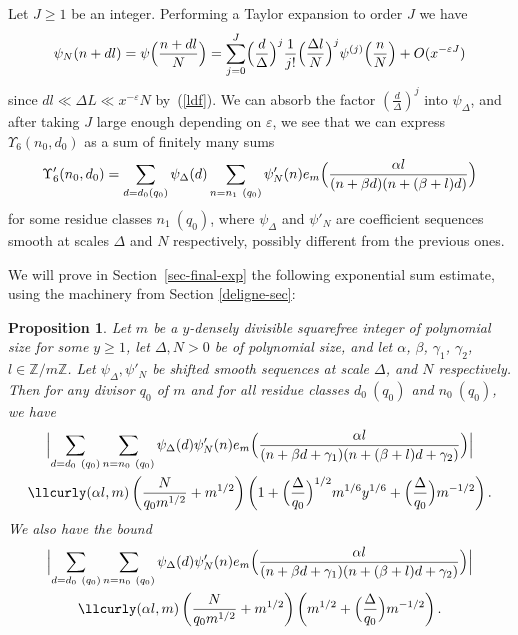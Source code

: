 \documentclass[12pt,a4paper,reqno]{amsart}
\numberwithin{equation}{section}
\theoremstyle{plain}
\newtheorem{proposition}[theorem]{Proposition}
\theoremstyle{definition}
\newcommand\Z{\mathbb{Z}}
\newcommand\eps{\varepsilon}
\renewcommand{\lessapprox}{\llcurly}
\begin{document}
Let $J\geq 1$ be an integer. Performing a Taylor expansion to order
$J$ we have
$$
\psi_N(n+dl) = \psi\Bigl(\frac{n+dl}{N}\Bigr)= \sum_{j=0}^J
\Bigl(\frac{d}{\Delta}\Bigr)^j\frac{1}{j!} \Bigl(\frac{\Delta l}{N}\Bigr)^j
\psi^{(j)}\Bigl(\frac{n}{N}\Bigr) + O( x^{-\eps J} )
$$
since $dl\ll \Delta L\ll x^{-\eps}N$ by~(\ref{ldf}).  We can absorb
the factor $(\frac{d}{\Delta})^j$ into $\psi_{\Delta}$, and after taking
$J$ large enough depending on $\eps$, we see that we can express $\Upsilon_6(n_0,d_0)$ as
a sum of finitely many sums
$$
\Upsilon'_6(n_0,d_0)= \sum_{d=d_0 (q_0)} \psi_{\Delta}(d) \sum_{n=n_1
  \ (q_0)} \psi'_N(n) e_m\Bigl(\frac{\alpha l}{(n+\beta d)(n+(\beta+l)d)}\Bigr)
$$
for some residue classes $n_1\ (q_0)$,
where $\psi_{\Delta}$ and $\psi'_N$ are coefficient sequences smooth at
scales $\Delta$ and $N$ respectively, possibly different from the previous
ones.

We will prove in Section~\ref{sec-final-exp} the following exponential
sum estimate, using the machinery from Section \ref{deligne-sec}:

\begin{proposition}\label{lode} 
  Let $m$ be a $y$-densely divisible squarefree integer of polynomial
  size for some $y \geq 1$, let $\Delta, N > 0$ be of polynomial size,
  and let $\alpha$, $\beta$, $\gamma_1$, $\gamma_2$, $l\in \Z/m\Z$.
  Let $\psi_{\Delta}, \psi'_N$ be shifted smooth sequences at scale
  $\Delta$, and $N$ respectively.   Then for any divisor $q_0$ of $m$
  and for all residue classes $d_0\ (q_0)$ and $n_0\ (q_0)$, we have
\begin{multline}\label{eq-lode-1}
  \Bigl|\sum_{d=d_0\ (q_0)} \sum_{n=n_0\ (q_0)} \psi_{\Delta}(d) \psi'_N(n)
  e_m\Bigl(
  \frac{\alpha l}{(n+\beta d+\gamma_1)(n+(\beta+l)d+\gamma_2)} \Bigr)\Bigr| \\
  \lessapprox (\alpha l,m) \left(\frac{N}{q_0m^{1/2}}+m^{1/2} \right)
  \left( 1 + \Bigl(\frac{\Delta}{q_0}\Bigr)^{1/2} m^{1/6} y^{1/6} +
    \Bigl(\frac{\Delta}{q_0}\Bigr) m^{-1/2}\right).
\end{multline}
We also have the bound
\begin{multline}\label{eq-lode-2}
  \Bigl|\sum_{d=d_0\ (q_0)} \sum_{n=n_0\ (q_0)} \psi_{\Delta}(d)
  \psi'_N(n) e_m\Bigl(
  \frac{\alpha l}{(n+\beta d+\gamma_1)(n+(\beta+l)d+\gamma_2)} \Bigr)\Bigr| \\
  \lessapprox (\alpha l,m) \left( \frac{N}{q_0m^{1/2}}+ m^{1/2} \right)
  \left( m^{1/2} + \Bigl(\frac{\Delta}{q_0}\Bigr) m^{-1/2}\right).
\end{multline}
\end{proposition}
\end{document}
